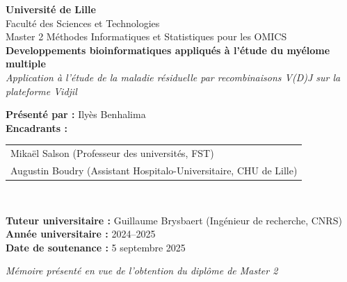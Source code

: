 \begin{titlepage}
    \centering
    \vspace*{1cm}

    {\Large \textbf{Université de Lille}}\\[0.5cm]
    {\large Faculté des Sciences et Technologies}\\[0.5cm]
    {\large Master 2 Méthodes Informatiques et Statistiques pour les OMICS}\\[2cm]

    {\Huge \bfseries Developpements bioinformatiques appliqués à l'étude du myélome multiple}\\[1cm]
    {\LARGE \textit{Application à l'étude de la maladie résiduelle par recombinaisons V(D)J sur la plateforme Vidjil}}\\[2.5cm]

    \begin{flushleft}
    \textbf{Présenté par :} Ilyès Benhalima\\
    \textbf{Encadrants :}
    \begin{tabular}[t]{@{}l}
        Mikaël Salson (Professeur des universités, FST) \\
        Augustin Boudry (Assistant Hospitalo-Universitaire, CHU de Lille)
    \end{tabular}\\

    \vspace{1em}

    \textbf{Tuteur universitaire :} Guillaume Brysbaert (Ingénieur de recherche, CNRS)\\[1.5cm]

    \textbf{Année universitaire :} 2024–2025\\
    \textbf{Date de soutenance :} 5 septembre 2025\\
    \end{flushleft}

    \vfill

    \textit{Mémoire présenté en vue de l’obtention du diplôme de Master 2}\\[2cm]


\end{titlepage}
